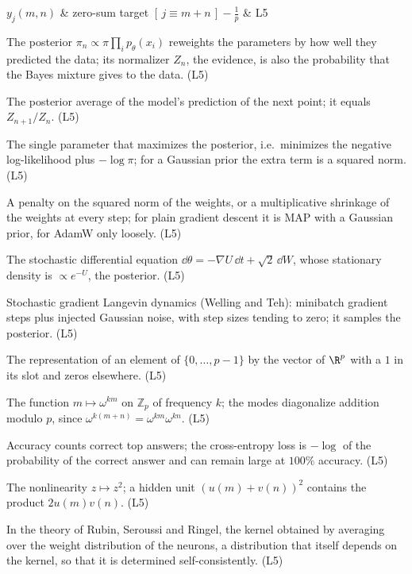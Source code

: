 $y_j(m,n)$ & zero-sum target $[\,j\equiv m+n\,]-\frac1p$ & L5\\
  \item[Posterior, evidence] The posterior $\pi_n\propto\pi\prod_ip_\theta(x_i)$ reweights the parameters by how well they predicted the data; its normalizer $Z_n$, the evidence, is also the probability that the Bayes mixture gives to the data. (L5)
  \item[Predictive distribution] The posterior average of the model's prediction of the next point; it equals $Z_{n+1}/Z_n$. (L5)
  \item[Maximum a posteriori (MAP)] The single parameter that maximizes the posterior, i.e.\ minimizes the negative log-likelihood plus $-\log\pi$; for a Gaussian prior the extra term is a squared norm. (L5)
  \item[Weight decay] A penalty on the squared norm of the weights, or a multiplicative shrinkage of the weights at every step; for plain gradient descent it is MAP with a Gaussian prior, for AdamW only loosely. (L5)
  \item[Langevin dynamics] The stochastic differential equation $\dd\theta=-\nabla U\,\dd t+\sqrt2\,\dd W$, whose stationary density is $\propto e^{-U}$, the posterior. (L5)
  \item[SGLD] Stochastic gradient Langevin dynamics (Welling and Teh): minibatch gradient steps plus injected Gaussian noise, with step sizes tending to zero; it samples the posterior. (L5)
  \item[One-hot encoding] The representation of an element of $\{0,\dots,p-1\}$ by the vector of $\R^p$ with a $1$ in its slot and zeros elsewhere. (L5)
  \item[Fourier mode] The function $m\mapsto\omega^{km}$ on $\mathbb Z_p$ of frequency $k$; the modes diagonalize addition modulo $p$, since $\omega^{k(m+n)}=\omega^{km}\omega^{kn}$. (L5)
  \item[Accuracy versus loss] Accuracy counts correct top answers; the cross-entropy loss is $-\log$ of the probability of the correct answer and can remain large at $100\%$ accuracy. (L5)
  \item[Square activation] The nonlinearity $z\mapsto z^2$; a hidden unit $(u(m)+v(n))^2$ contains the product $2u(m)v(n)$. (L5)
  \item[Adaptive (deterministic) kernel] In the theory of Rubin, Seroussi and Ringel, the kernel obtained by averaging over the weight distribution of the neurons, a distribution that itself depends on the kernel, so that it is determined self-consistently. (L5)
